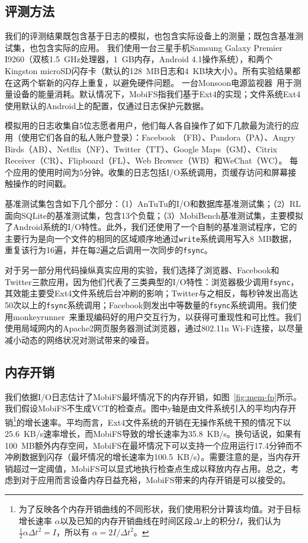 \subsection{评测方法} \label{subsec-method}

我们的评测结果既包含基于日志的模拟，也包含实际设备上的测量；既包含基准测试集，也包含实际的应用。
我们使用一台三星手机Samsung
Galaxy Premier I9260（双核1.5~GHz处理器，1~GB内存，Android 4.1操作系统），和两个Kingston microSD闪存卡（默认的128~MB日志和4~KB块大小）。所有实验结果都在这两个崭新的闪存上重复，以避免硬件问题。
一台Monsoon电源监视器~\cite{Monsoon:PM}用于测量设备的能量消耗。默认情况下，MobiFS指我们基于Ext4的实现；文件系统Ext4使用默认的Android上的配置，仅通过日志保护元数据。

模拟用的日志收集自5位志愿者用户，他们每人各自操作了如下几款最为流行的应用（使用它们各自的私人账户登录）：Facebook
（FB）、Pandora（PA）、Angry Birds（AB）、Netflix（NF）、Twitter（TT）、Google Maps（GM）、Citrix Receiver（CR）、Flipboard（FL）、Web Browser（WB）和WeChat（WC）。 每个应用的使用时间为5分钟。收集的日志包括I/O系统调用，页缓存访问和屏幕接触操作的时间戳。

基准测试集包含如下几个部分：（1）AnTuTu的I/O和数据库基准测试集；（2）RL面向SQLite的基准测试集，包含13个负载；（3）MobiBench基准测试集，主要模拟了Android系统的I/O特性。此外，我们还使用了一个自制的基准测试程序，它的主要行为是向一个文件的相同的区域顺序地通过\texttt{write}系统调用写入8~MB数据，重复该行为16遍，并在每2遍之后调用一次同步的\texttt{fsync}。

对于另一部分用代码操纵真实应用的实验，我们选择了浏览器、Facebook和Twitter三款应用，因为他们代表了三类典型的I/O特性：浏览器极少调用\texttt{fsync}，其效能主要受Ext4文件系统后台冲刷的影响；Twitter与之相反，每秒钟发出高达50次以上的\texttt{fsync}系统调用；Facebook则发出中等数量的\texttt{fsync}系统调用。我们使用monkeyrunner~\cite{Monkeyrunner}来重现编码好的用户交互行为，以获得可重现性和可比性。我们使用局域网内的Apache2网页服务器测试浏览器，通过802.11n Wi-Fi连接，以尽量减小动态的网络状况对测试带来的噪音。

\subsection{内存开销} \label{subsec:mem-fp}

我们依据I/O日志估计了MobiFS最坏情况下的内存开销，如图~\ref{fig:mem-fp}所示。
我们假设MobiFS不生成VCT的检查点。图中y轴是由文件系统引入的平均内存开销\footnote{为了反映各个内存开销曲线的不同形状，我们使用积分计算该均值。对于目标增长速率
$\alpha$以及已知的内存开销曲线在时间区段${\Delta t}$上的积分$I$，我们认为$\frac{1}{2}\alpha{\Delta t}^2 = I$，所以有
$\alpha=2I/{\Delta t}^2$。}的增长速率。平均而言，Ext4文件系统的开销在无操作系统干预的情况下以25.6~KB/s速率增长，而MobiFS导致的增长速率为35.8~KB/s。换句话说，如果有100~MB额外内存空间，MobiFS在最坏情况下可以支持一个应用运行17.4分钟而不冲刷数据到闪存（最坏情况的增长速率为100.5~KB/s）。需要注意的是，当内存开销超过一定阈值，MobiFS可以显式地执行检查点生成以释放内存占用。总之，考虑到对于应用而言设备内存日益充裕，MobiFS带来的内存开销是可以接受的。

